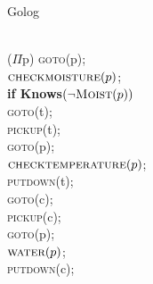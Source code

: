 \begin{frame}[fragile]{Golog}
    \vspace*{-1.5cm}
    \hspace*{2.5cm}
    \begin{minipage}{\linewidth}
        \begin{algorithmic}[1]
             \\
            \quad ($\mathit{\Pi}$p) \textsc{goto}(p); \\
            \quad \quad $\textsc{checkmoisture}(p)$; \\
            \quad \quad \textbf{if Knows}$(\neg \textsc{Moist}(p))$ \\
            \quad \quad \quad \textsc{goto}(t); \\
            \quad \quad \quad \quad \textsc{pickup}(t); \\
            \quad \quad \quad \quad \textsc{goto}(p); \\
            \quad \quad \quad \quad $\textsc{checktemperature}(p)$; \\
            \quad \quad \quad \quad \textsc{putdown}(t); \\
            \quad \quad \quad \textsc{goto}(c); \\
            \quad \quad \quad \quad \textsc{pickup}(c); \\
            \quad \quad \quad \quad \textsc{goto}(p); \\
            \quad \quad \quad \quad $\textsc{water}(p)$; \\
            \quad \quad \quad \quad \textsc{putdown}(c);
            \EndWhile
        \end{algorithmic}
    \end{minipage}
\end{frame}